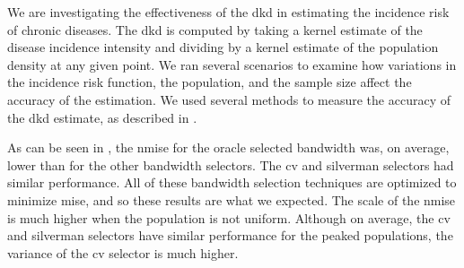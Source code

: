 

We are investigating the effectiveness of the \gls{dkd} in estimating the incidence risk of chronic diseases. 
The \gls{dkd} is computed by taking a kernel estimate of the disease incidence intensity and dividing by a kernel estimate of the population density at any given point.
We ran several scenarios to examine how variations in the incidence risk function,
the population, and the sample size affect the accuracy of the estimation. 
We used several methods to measure the accuracy of the \gls{dkd} estimate,
as described in .

As can be seen in ,
the \gls{nmise} for the \gls{oracle} selected bandwidth was, on average,
lower than for the other bandwidth selectors.
The \gls{cv} and \gls{silverman} selectors had similar performance.
All of these bandwidth selection techniques are optimized to minimize \gls{mise},
and so these results are what we expected.
The scale of the \gls{nmise} is much higher when the population is not uniform.
Although on average, the \gls{cv} and \gls{silverman} selectors have similar performance for the peaked populations,
the variance of the \gls{cv} selector is much higher.

